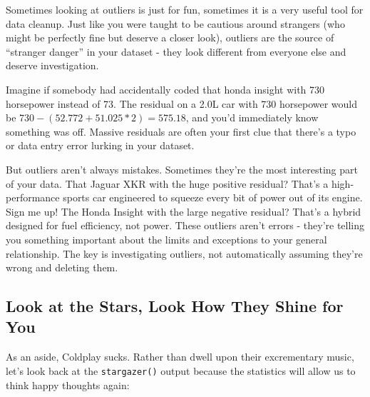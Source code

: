 \documentclass[
  letterpaper,
]{book}
\begin{document}
\begin{tcolorbox}[enhanced jigsaw, colframe=quarto-callout-tip-color-frame, breakable, arc=.35mm, bottomtitle=1mm, bottomrule=.15mm, colbacktitle=quarto-callout-tip-color!10!white, rightrule=.15mm, colback=white, opacityback=0, opacitybacktitle=0.6, coltitle=black, left=2mm, toptitle=1mm, toprule=.15mm, titlerule=0mm, leftrule=.75mm, title=\textcolor{quarto-callout-tip-color}{\faLightbulb}\hspace{0.5em}{Data Storytelling: Outliers and Stranger Danger!}]

Sometimes looking at outliers is just for fun, sometimes it is a very
useful tool for data cleanup. Just like you were taught to be cautious
around strangers (who might be perfectly fine but deserve a closer
look), outliers are the source of ``stranger danger'' in your dataset -
they look different from everyone else and deserve investigation.

Imagine if somebody had accidentally coded that honda insight with 730
horsepower instead of 73. The residual on a 2.0L car with 730 horsepower
would be \(730 - (52.772 + 51.025*2) = 575.18\), and you'd immediately
know something was off. Massive residuals are often your first clue that
there's a typo or data entry error lurking in your dataset.

But outliers aren't always mistakes. Sometimes they're the most
interesting part of your data. That Jaguar XKR with the huge positive
residual? That's a high-performance sports car engineered to squeeze
every bit of power out of its engine. Sign me up! The Honda Insight with
the large negative residual? That's a hybrid designed for fuel
efficiency, not power. These outliers aren't errors - they're telling
you something important about the limits and exceptions to your general
relationship. The key is investigating outliers, not automatically
assuming they're wrong and deleting them.

\end{tcolorbox}

\subsection{Look at the Stars, Look How They Shine for
You}\label{look-at-the-stars-look-how-they-shine-for-you}

As an aside, Coldplay sucks. Rather than dwell upon their excrementary
music, let's look back at the \texttt{stargazer()} output because the
statistics will allow us to think happy thoughts again:
\end{document}
